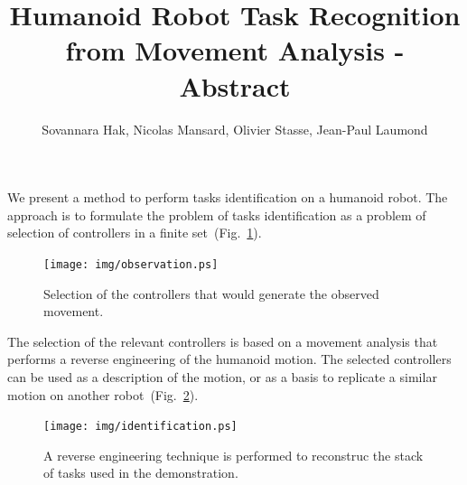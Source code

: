 \documentclass[letterpaper, 10pt, conference]{ieeeconf}      %
\author {Sovannara Hak, Nicolas Mansard, Olivier Stasse, Jean-Paul Laumond}
\title{Humanoid Robot Task Recognition from Movement Analysis - Abstract}
\begin{document}
\maketitle

We present a method to perform tasks identification on a
humanoid robot. The approach is to formulate
the problem of tasks identification as a problem of
selection of controllers in a finite set~(Fig.~\ref{fig:observation}). 
\begin{figure}[t]
\begin{center}
\texttt{[image: img/observation.ps]}
\end{center}
\caption{Selection of the controllers that would generate the observed movement.}
\label{fig:observation}
\end{figure}

The selection of the relevant controllers is based on a movement analysis
that performs a reverse engineering of the humanoid motion.
The selected controllers can be used as a description of the motion, or as
a basis to replicate a similar motion on another robot~(Fig.~\ref{fig:identification}).
\begin{figure}[t]
\begin{center}
\texttt{[image: img/identification.ps]}
\end{center}
\caption{A reverse engineering technique is performed to reconstruc the stack of tasks
used in the demonstration.}
\label{fig:identification}
\end{figure}
\end{document}
